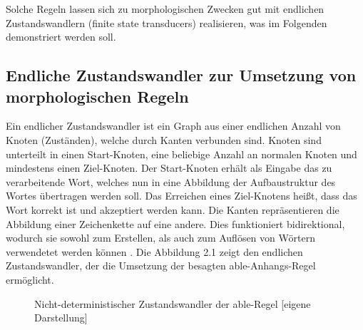 \documentclass[12pt]{report}
\begin{document}
Solche Regeln lassen sich zu morphologischen Zwecken gut mit endlichen Zustandswandlern (finite state transducers) realisieren, was im Folgenden demonstriert werden soll.

\subsection{Endliche Zustandswandler zur Umsetzung von morphologischen Regeln}
Ein endlicher Zustandswandler ist ein Graph aus einer endlichen Anzahl von Knoten (Zuständen), welche durch Kanten verbunden sind. Knoten sind unterteilt in einen Start-Knoten, eine beliebige Anzahl an normalen Knoten und mindestens einen Ziel-Knoten. Der Start-Knoten erhält als Eingabe das zu verarbeitende Wort, welches nun in eine Abbildung der Aufbaustruktur des Wortes übertragen werden soll. Das Erreichen eines Ziel-Knotens heißt, dass das Wort korrekt ist und akzeptiert werden kann. Die Kanten repräsentieren die Abbildung einer Zeichenkette auf eine andere. Dies funktioniert bidirektional, wodurch sie sowohl zum Erstellen, als auch zum Auflösen von Wörtern verwendetet werden können \cite{cop04}. Die Abbildung 2.1 zeigt den endlichen Zustandswandler, der die Umsetzung der besagten \glqq  able\grqq{}-Anhangs-Regel ermöglicht.
\\

\begin{figure}[h!]
\begin{center}
\caption{Nicht-deterministischer Zustandswandler der able-Regel [eigene Darstellung]}
\end{center}
\end{figure}
\end{document}
